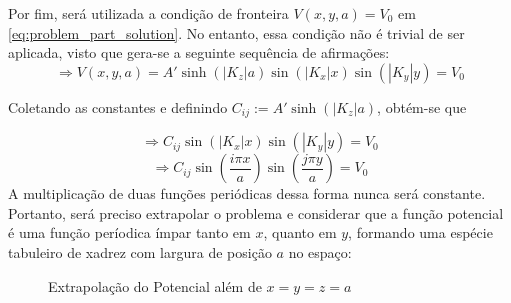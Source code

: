 \documentclass{report}
\begin{document}
Por fim, será utilizada a condição de fronteira $ V(x, y, a) = V_0 $ em \ref{eq:problem_part_solution}.
No entanto, essa condição não é trivial de ser aplicada, visto que gera-se
a seguinte sequência de afirmações:
$$ \Rightarrow V(x, y, a) = A'\sinh(|K_z|a)\sin(|K_x|x)\sin(|K_y|y) = V_0 $$

Coletando as constantes e definindo $ C_{ij} := A'\sinh(|K_z|a) $, obtém-se que

$$ \Rightarrow C_{ij}\sin(|K_x|x)\sin(|K_y|y) = V_0 $$
$$ \Rightarrow C_{ij}\sin\left(\frac{i\pi x}{a}\right)\sin\left(\frac{j\pi y}{a}\right) = V_0 $$
\clearpage
A multiplicação de duas funções periódicas dessa forma nunca será constante. Portanto, será
preciso extrapolar o problema e considerar que a função potencial é uma função períodica ímpar tanto em
$ x $, quanto em $ y $, formando uma espécie tabuleiro de xadrez com largura de posição $ a $ no espaço:

\begin{figure}[!h]
    \centering
    \caption{\label{plot:potential_ext} Extrapolação do Potencial além de $ x = y = z = a $}
\end{figure}
\end{document}
